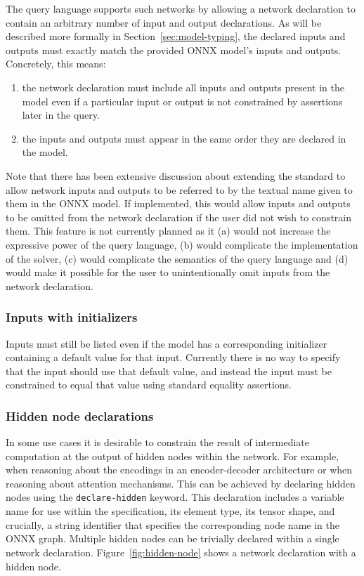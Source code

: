The query language supports such networks by allowing a network declaration to contain an arbitrary number of input and output declarations. 
As will be described more formally in Section~\ref{sec:model-typing}, the declared inputs and outputs must exactly match the provided ONNX model's inputs and outputs. Concretely, this means:
\begin{enumerate}
    \item the network declaration must include all inputs and outputs present in the model even if a particular input or output is not constrained by assertions later in the query.
    \item the inputs and outputs must appear in the same order they are declared in the model.
\end{enumerate}
Note that there has been extensive discussion about extending the standard to allow network inputs and outputs to be referred to by the textual name given to them in the ONNX model. 
If implemented, this would allow inputs and outputs to be omitted from the network declaration if the user did not wish to constrain them. 
This feature is not currently planned as it (a) would not increase the expressive power of the query language, (b) would complicate the implementation of the solver, (c) would complicate the semantics of the query language and (d) would make it possible for the user to unintentionally omit inputs from the network declaration.

\subsubsection{Inputs with initializers}

Inputs must still be listed even if the model has a corresponding initializer containing a default value for that input. Currently there is no way to specify that the input should use that default value, and instead the input must be constrained to equal that value using standard equality assertions.


\subsubsection{Hidden node declarations}
\label{sec:hidden-output-declarations}

In some use cases it is desirable to constrain the result of intermediate computation at the output of hidden nodes within the network. For example, when reasoning about the encodings in an encoder-decoder architecture or when reasoning about attention mechanisms. This can be achieved by declaring hidden nodes using the \texttt{declare-hidden} keyword. This declaration includes a variable name for use within the \vnnlib{} specification,  its element type, its tensor shape, and crucially, a string identifier that specifies the corresponding node name in the ONNX graph.  Multiple hidden nodes can be trivially declared within a single network declaration. Figure~\ref{fig:hidden-node} shows a \vnnlib{} network declaration with a hidden node.

